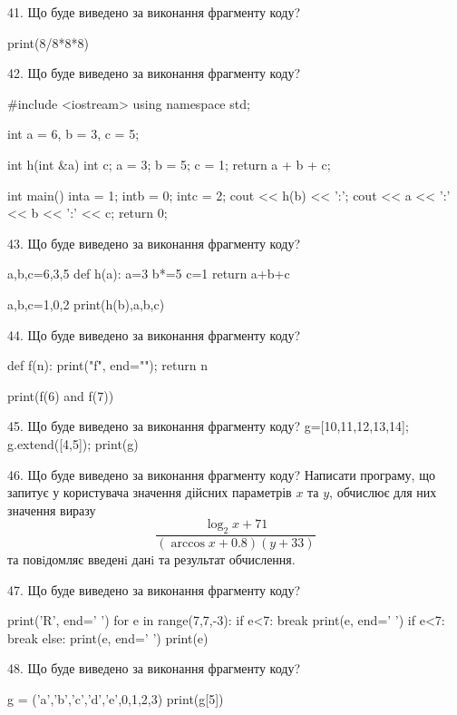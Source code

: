 \documentclass[11pt]{article}
\begin{document}

41. Що буде виведено за виконання фрагменту коду?

print(8/8*8*8)


42. Що буде виведено за виконання фрагменту коду?

#include <iostream>
using namespace std;

int a = 6, b = 3, c = 5;

int h(int &a){
int c;    a = 3;
    b = 5;
    c = 1;
    return a + b + c;
}

int main(){
    inta = 1;
    intb = 0;
    intc = 2;
    cout << h(b) << ':';
    cout << a << ':' << b << ':' << c;
    return 0; 
}


43. Що буде виведено за виконання фрагменту коду?

a,b,c=6,3,5
def h(a):
    a=3
    b*=5
    c=1
    return a+b+c

a,b,c=1,0,2
print(h(b),a,b,c)


44. Що буде виведено за виконання фрагменту коду?

def f(n):
    print("f", end="");
    return n

print(f(6) and f(7))


45. Що буде виведено за виконання фрагменту коду?
g=[10,11,12,13,14]; g.extend([4,5]); print(g)

46. Що буде виведено за виконання фрагменту коду?
Написати програму, що запитує у користувача значення дійсних параметрів $x$ та $y$, обчислює для них значення виразу 
$$\frac{\log_{2} x + 71}{(\arccos x + 0.8) (y + 33)}$$ 
та повiдомляє введенi данi та результат обчислення.



47. Що буде виведено за виконання фрагменту коду?

print('R', end=' ')
for e in range(7,7,-3):
    if e<7:
        break
        print(e, end=' ')
    if e<7:
        break
    else:
        print(e, end=' ')
    print(e)


48. Що буде виведено за виконання фрагменту коду?

g = ('a','b','c','d','e',0,1,2,3)
print(g[5])
\end{document}
